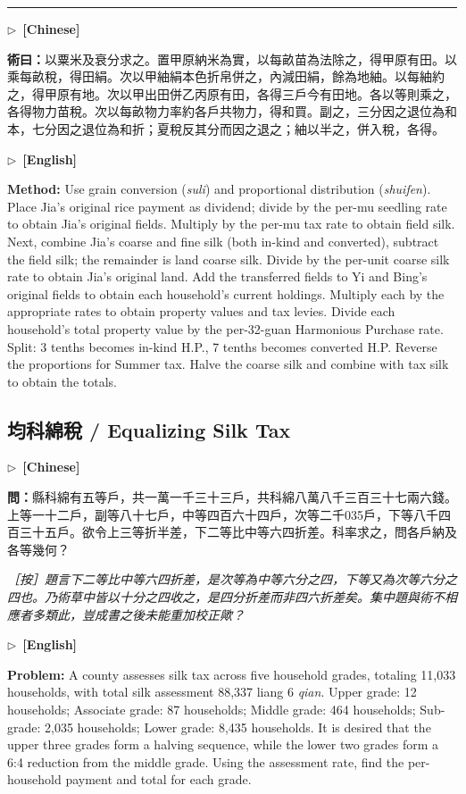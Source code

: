 \documentclass[10pt,a4paper]{article}
\newcommand{\longline}{\par\noindent\rule{\textwidth}{0.4pt}\par}
\newcommand{\CNmarker}{\noindent\textcolor{cnlabel}{$\triangleright$\ \textbf{[Chinese]}}\par}
\newcommand{\ENmarker}{\noindent\textcolor{enlabel}{$\triangleright$\ \textbf{[English]}}\par}
\newcommand{\Question}[1]{\par\noindent\textbf{\color{problemcolor}問：}#1\par}
\newcommand{\Method}[1]{\par\noindent\textbf{\color{methodcolor}術曰：}#1\par}
\newcommand{\EditorialNote}[1]{\par\noindent\textit{［按］#1}\par}
\newcommand{\QuestionEn}[1]{\par\noindent\textbf{\color{problemcolor}Problem:} #1\par}
\newcommand{\MethodEn}[1]{\par\noindent\textbf{\color{methodcolor}Method:} #1\par}
\begin{document}
\longline

\CNmarker
\Method{以粟米及衰分求之。置甲原納米為實，以每畝苗為法除之，得甲原有田。以乘每畝稅，得田絹。次以甲紬絹本色折帛併之，內減田絹，餘為地紬。以每紬約之，得甲原有地。次以甲出田併乙丙原有田，各得三戶今有田地。各以等則乘之，各得物力苗稅。次以每畝物力率約各戶共物力，得和買。副之，三分因之退位為和本，七分因之退位為和折；夏稅反其分而因之退之；紬以半之，併入稅，各得。}

\ENmarker
\MethodEn{Use grain conversion (\textit{suli}) and proportional distribution (\textit{shuifen}). Place Jia's original rice payment as dividend; divide by the per-mu seedling rate to obtain Jia's original fields. Multiply by the per-mu tax rate to obtain field silk. Next, combine Jia's coarse and fine silk (both in-kind and converted), subtract the field silk; the remainder is land coarse silk. Divide by the per-unit coarse silk rate to obtain Jia's original land. Add the transferred fields to Yi and Bing's original fields to obtain each household's current holdings. Multiply each by the appropriate rates to obtain property values and tax levies. Divide each household's total property value by the per-32-guan Harmonious Purchase rate. Split: 3 tenths becomes in-kind H.P., 7 tenths becomes converted H.P. Reverse the proportions for Summer tax. Halve the coarse silk and combine with tax silk to obtain the totals.}


\newpage
\subsection*{均科綿稅 / Equalizing Silk Tax}

\CNmarker
\Question{縣科綿有五等戶，共一萬一千三十三戶，共科綿八萬八千三百三十七兩六錢。上等一十二戶，副等八十七戶，中等四百六十四戶，次等二千035戶，下等八千四百三十五戶。欲令上三等折半差，下二等比中等六四折差。科率求之，問各戶納及各等幾何？}

\EditorialNote{題言下二等比中等六四折差，是次等為中等六分之四，下等又為次等六分之四也。乃術草中皆以十分之四收之，是四分折差而非四六折差矣。集中題與術不相應者多類此，豈成書之後未能重加校正歟？}

\ENmarker
\QuestionEn{A county assesses silk tax across five household grades, totaling 11,033 households, with total silk assessment 88,337 liang 6 \textit{qian}. Upper grade: 12 households; Associate grade: 87 households; Middle grade: 464 households; Sub-grade: 2,035 households; Lower grade: 8,435 households. It is desired that the upper three grades form a halving sequence, while the lower two grades form a 6:4 reduction from the middle grade. Using the assessment rate, find the per-household payment and total for each grade.}
\end{document}
